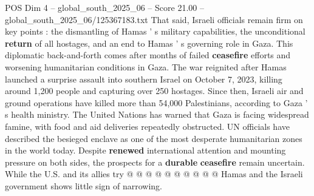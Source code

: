 \begin{textsample}{POS Dim 4 – global\_south\_2025\_06 – Score 21.00 – global\_south\_2025\_06/125367183.txt}
That said, Israeli officials remain firm on key points : the dismantling of Hamas ' s military capabilities, the unconditional \textbf{return} of all hostages, and an end to Hamas ' s governing role in Gaza.
This diplomatic back-and-forth comes after months of failed \textbf{ceasefire} efforts and worsening humanitarian conditions in Gaza.
The war reignited after Hamas launched a surprise assault into southern Israel on October 7, 2023, killing around 1,200 people and capturing over 250 hostages.
Since then, Israeli air and ground operations have killed more than 54,000 Palestinians, according to Gaza ' s health ministry.
The United Nations has warned that Gaza is facing widespread famine, with food and aid deliveries repeatedly obstructed.
UN officials have described the besieged enclave as one of the most desperate humanitarian zones in the world today.
Despite \textbf{renewed} international attention and mounting pressure on both sides, the prospects for a \textbf{durable} \textbf{ceasefire} remain uncertain.
While the U.S. and its allies try @ @ @ @ @ @ @ @ @ @ Hamas and the Israeli government shows little sign of narrowing.

\end{textsample}
